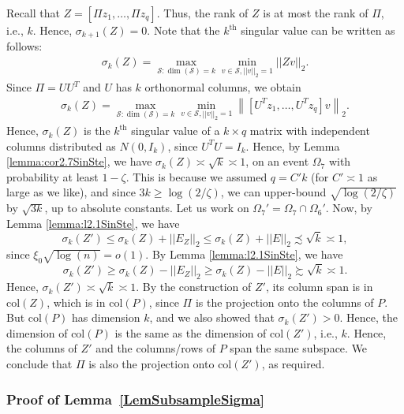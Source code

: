 \documentclass{article}
\begin{document}
Recall that $Z = [\Pi z_1, \dots, \Pi z_q]$. Thus, the rank of $Z$ is at most the rank of $\Pi$, i.e., $k$. Hence, $\sigma_{k + 1}(Z) = 0$. Note that the $k^{\text{th}}$ singular value can be written as follows:
\begin{align*}
\sigma_k(Z) = \mathop{\max}\limits_{\mathcal{S}: \dim(\mathcal{S}) = k}\mathop{\min}\limits_{v \in \mathcal{S}, ||v||_2 = 1}||Zv||_2.
\end{align*}
Since $\Pi = UU^T$ and $U$ has $k$ orthonormal columns, we obtain
\begin{align*}
\sigma_k(Z) = \mathop{\max}\limits_{\mathcal{S}: \dim(\mathcal{S}) = k}\mathop{\min}\limits_{v \in \mathcal{S}, ||v||_2 = 1}\left\|[U^Tz_1, \dots, U^Tz_q]v\right\|_2.
\end{align*}
Hence, $\sigma_k(Z)$ is the $k^{\text{th}}$ singular value of a $k \times q$ matrix with independent columns distributed as $N(0, I_k)$, since $U^TU = I_k$. Hence, by Lemma \ref{lemma:cor2.7SinSte}, we have
$\sigma_k(Z) \asymp \sqrt{k} \asymp 1$, on an event $\Omega_7$ with probability at least $1 - \zeta$. This is because we assumed $q = C'k$ (for $C' \asymp 1$ as large as we like), and since $3k \geq \log(2/\zeta)$, we can upper-bound $\sqrt{\log(2/\zeta)}$ by $\sqrt{3k}$, up to absolute constants. Let us work on $\Omega_7' = \Omega_7 \cap \Omega_6'$. Now, by Lemma \ref{lemma:l2.1SinSte}, we have
\begin{equation*}
\sigma_k(Z') \leq \sigma_k(Z) + ||E_Z||_2 \leq \sigma_k(Z) + ||E||_2 \precsim \sqrt{k} \asymp 1,
\end{equation*}
since $\xi_0\sqrt{\log(n)} = o(1)$. By Lemma \ref{lemma:l2.1SinSte}, we have
\begin{equation*}
\sigma_k(Z') \geq \sigma_k(Z) - ||E_Z||_2 \geq \sigma_k(Z) - ||E||_2 \succsim \sqrt{k} \asymp 1.
\end{equation*}
Hence, $\sigma_k(Z') \asymp \sqrt{k} \asymp 1$. By the construction of $Z'$, its column span is in $\text{col}(Z)$, which is in $\text{col}(P)$, since $\Pi$ is the projection onto the columns of $P$. But $\text{col}(P)$ has dimension $k$, and we also showed that $\sigma_k(Z') > 0$. Hence, the dimension of $\text{col}(P)$ is the same as the dimension of $\text{col}(Z')$, i.e., $k$. Hence, the columns of $Z'$ and the columns/rows of $P$ span the same subspace. We conclude that $\Pi$ is also the projection onto $\text{col}(Z')$, as required.


\subsubsection{Proof of Lemma~\ref{LemSubsampleSigma}}
\label{AppLemSubSample}
\end{document}
